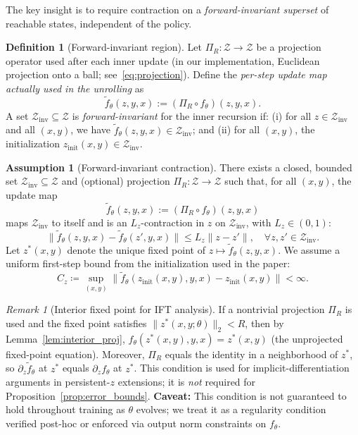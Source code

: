 \documentclass{article}
\theoremstyle{plain}
\theoremstyle{definition}
\newtheorem{definition}[theorem]{Definition}
\newtheorem{assumption}[theorem]{Assumption}
\theoremstyle{remark}
\newtheorem{remark}[theorem]{Remark}
\newcommand{\ZZ}{\mathcal{Z}}
\begin{document}
{The key insight is to require contraction on a \emph{forward-invariant superset} of reachable states, independent of the policy.

\begin{definition}[Forward-invariant region]
\label{def:forward_invariant}
Let $\Pi_R:\ZZ\to\ZZ$ be a projection operator used after each inner update
(in our implementation, Euclidean projection onto a ball; see~\eqref{eq:projection}).
Define the \emph{per-step update map actually used in the unrolling} as
\[
\tilde f_\theta(z,y,x) := (\Pi_R \circ f_\theta)(z,y,x).
\]
A set $\mathcal{Z}_{\mathrm{inv}} \subseteq \ZZ$ is \emph{forward-invariant} for the inner recursion if:
(i) for all $z \in \mathcal{Z}_{\mathrm{inv}}$ and all $(x,y)$, we have $\tilde f_\theta(z,y,x) \in \mathcal{Z}_{\mathrm{inv}}$; and
(ii) for all $(x,y)$, the initialization $z_{\mathrm{init}}(x,y) \in \mathcal{Z}_{\mathrm{inv}}$.
\end{definition}


\begin{assumption}[Forward-invariant contraction]
\label{ass:Lip}
There exists a closed, bounded set $\mathcal{Z}_{\mathrm{inv}}\subseteq\ZZ$ and (optional) projection $\Pi_R:\ZZ\to\ZZ$ such that, for all $(x,y)$, the update map
\[
\tilde f_\theta(z,y,x):=(\Pi_R\circ f_\theta)(z,y,x)
\]
maps $\mathcal{Z}_{\mathrm{inv}}$ to itself and is an $L_z$-contraction in $z$ on $\mathcal{Z}_{\mathrm{inv}}$, with $L_z\in(0,1)$:
\[
\|\tilde f_\theta(z,y,x)-\tilde f_\theta(z',y,x)\|\le L_z\|z-z'\|,\quad \forall z,z'\in\mathcal{Z}_{\mathrm{inv}}.
\]
Let $z^*(x,y)$ denote the unique fixed point of $z\mapsto \tilde f_\theta(z,y,x)$.
We assume a uniform first-step bound from the initialization used in the paper:
\begin{equation}
C_z \coloneqq \sup_{(x,y)}\bigl\|\tilde f_\theta(z_{\mathrm{init}}(x,y),y,x)-z_{\mathrm{init}}(x,y)\bigr\|<\infty.
\label{eq:Cz_def}
\end{equation}
\end{assumption}

\begin{remark}[Interior fixed point for IFT analysis]
\label{rem:interior_fp}
If a nontrivial projection $\Pi_R$ is used and the fixed point satisfies $\|z^*(x,y;\theta)\|_2 < R$, then by Lemma~\ref{lem:interior_proj}, $f_\theta(z^*(x,y),y,x)=z^*(x,y)$ (the unprojected fixed-point equation).
Moreover, $\Pi_R$ equals the identity in a neighborhood of $z^*$, so $\partial_z\tilde f_\theta$ at $z^*$ equals $\partial_z f_\theta$ at $z^*$.
This condition is used for implicit-differentiation arguments in persistent-$z$ extensions; it is \emph{not} required for Proposition~\ref{prop:error_bounds}.
\textbf{Caveat:} This condition is not guaranteed to hold throughout training as $\theta$ evolves; we treat it as a regularity condition verified post-hoc or enforced via output norm constraints on $f_\theta$.
\end{remark}

}
\end{document}

